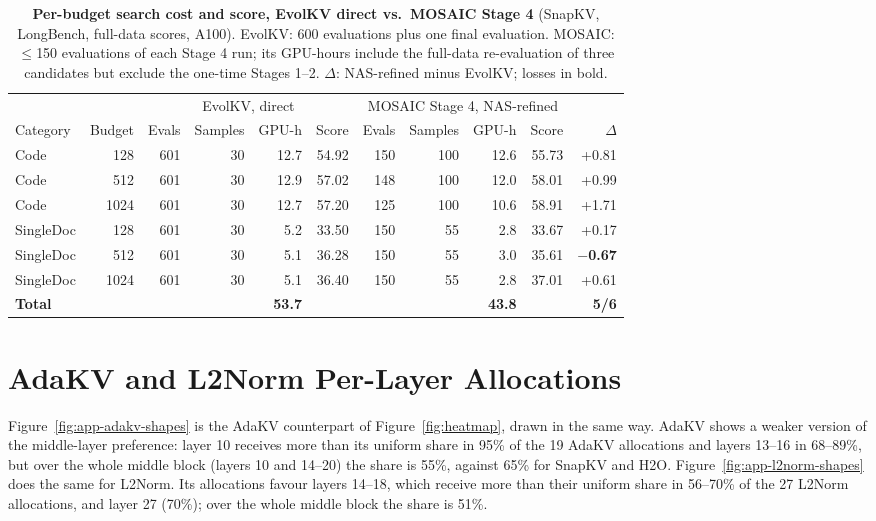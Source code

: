 \begin{table}[tp]
  \centering
  \footnotesize
  \setlength{\tabcolsep}{4pt}
  \begin{tabular}{@{}l r r r r r r r r r r@{}}
    \toprule
    & & \multicolumn{4}{c}{EvolKV, direct} & \multicolumn{4}{c}{MOSAIC Stage 4, NAS-refined} & \\ \cmidrule(lr){3-6}\cmidrule(lr){7-10}
    Category & Budget & Evals & Samples & GPU-h & Score & Evals & Samples & GPU-h & Score & $\Delta$ \\
    \midrule
    Code & 128 & 601 & 30 & 12.7 & 54.92 & 150 & 100 & 12.6 & 55.73 & +0.81 \\
    Code & 512 & 601 & 30 & 12.9 & 57.02 & 148 & 100 & 12.0 & 58.01 & +0.99 \\
    Code & 1024 & 601 & 30 & 12.7 & 57.20 & 125 & 100 & 10.6 & 58.91 & +1.71 \\
    SingleDoc & 128 & 601 & 30 & 5.2 & 33.50 & 150 & 55 & 2.8 & 33.67 & +0.17 \\
    SingleDoc & 512 & 601 & 30 & 5.1 & 36.28 & 150 & 55 & 3.0 & 35.61 & \textbf{$-$0.67} \\
    SingleDoc & 1024 & 601 & 30 & 5.1 & 36.40 & 150 & 55 & 2.8 & 37.01 & +0.61 \\
    \textbf{Total} &  &  &  & \textbf{53.7} &  &  &  & \textbf{43.8} &  & \textbf{5/6} \\
    \bottomrule
  \end{tabular}
  \caption{\textbf{Per-budget search cost and score, EvolKV direct vs.\ MOSAIC Stage 4} (SnapKV, LongBench, full-data scores, A100). EvolKV: 600 evaluations plus one final evaluation. MOSAIC: $\leq$150 evaluations of each Stage 4 run; its GPU-hours include the full-data re-evaluation of three candidates but exclude the one-time Stages 1--2. $\Delta$: NAS-refined minus EvolKV; losses in bold.}
  \label{tab:app-cost}
\end{table}


\section{AdaKV and L2Norm Per-Layer Allocations}
\label{app:adakv-shapes}

Figure~\ref{fig:app-adakv-shapes} is the AdaKV counterpart of Figure~\ref{fig:heatmap}, drawn in the same way. AdaKV shows a weaker version of the middle-layer preference: layer 10 receives more than its uniform share in 95\% of the 19 AdaKV allocations and layers 13--16 in 68--89\%, but over the whole middle block (layers 10 and 14--20) the share is 55\%, against 65\% for SnapKV and H2O. Figure~\ref{fig:app-l2norm-shapes} does the same for L2Norm. Its allocations favour layers 14--18, which receive more than their uniform share in 56--70\% of the 27 L2Norm allocations, and layer 27 (70\%); over the whole middle block the share is 51\%.

